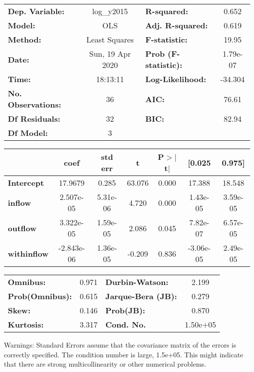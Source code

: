 \begin{center}
\begin{tabular}{lclc}
\toprule
\textbf{Dep. Variable:}    &    log\_y2015    & \textbf{  R-squared:         } &     0.652   \\
\textbf{Model:}            &       OLS        & \textbf{  Adj. R-squared:    } &     0.619   \\
\textbf{Method:}           &  Least Squares   & \textbf{  F-statistic:       } &     19.95   \\
\textbf{Date:}             & Sun, 19 Apr 2020 & \textbf{  Prob (F-statistic):} &  1.79e-07   \\
\textbf{Time:}             &     18:13:11     & \textbf{  Log-Likelihood:    } &   -34.304   \\
\textbf{No. Observations:} &          36      & \textbf{  AIC:               } &     76.61   \\
\textbf{Df Residuals:}     &          32      & \textbf{  BIC:               } &     82.94   \\
\textbf{Df Model:}         &           3      & \textbf{                     } &             \\
\bottomrule
\end{tabular}
\begin{tabular}{lcccccc}
                    & \textbf{coef} & \textbf{std err} & \textbf{t} & \textbf{P$> |$t$|$} & \textbf{[0.025} & \textbf{0.975]}  \\
\midrule
\textbf{Intercept}  &      17.9679  &        0.285     &    63.076  &         0.000        &       17.388    &       18.548     \\
\textbf{inflow}     &    2.507e-05  &     5.31e-06     &     4.720  &         0.000        &     1.43e-05    &     3.59e-05     \\
\textbf{outflow}    &    3.322e-05  &     1.59e-05     &     2.086  &         0.045        &     7.82e-07    &     6.57e-05     \\
\textbf{withinflow} &   -2.843e-06  &     1.36e-05     &    -0.209  &         0.836        &    -3.06e-05    &     2.49e-05     \\
\bottomrule
\end{tabular}
\begin{tabular}{lclc}
\textbf{Omnibus:}       &  0.971 & \textbf{  Durbin-Watson:     } &    2.199  \\
\textbf{Prob(Omnibus):} &  0.615 & \textbf{  Jarque-Bera (JB):  } &    0.279  \\
\textbf{Skew:}          &  0.146 & \textbf{  Prob(JB):          } &    0.870  \\
\textbf{Kurtosis:}      &  3.317 & \textbf{  Cond. No.          } & 1.50e+05  \\
\bottomrule
\end{tabular}
\end{center}

Warnings: \newline
 [1] Standard Errors assume that the covariance matrix of the errors is correctly specified. \newline
 [2] The condition number is large, 1.5e+05. This might indicate that there are \newline
 strong multicollinearity or other numerical problems.